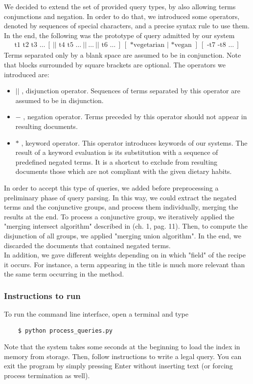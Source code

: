 We decided to extend the set of provided query types, by also allowing terms conjunctions and negation. In order to do that, we introduced some operators, denoted by sequences of special characters, and a precise syntax rule to use them. In the end, the following was the prototype of query admitted by our system
\begin{align*}
	\text{t1 t2 t3 }\ldots \ [ \ || \text{ t4 t5 } \ldots \ || \ \ldots \ || \text{ t6 }\ldots \ ] \ [ \text{ *vegetarian } | \text{ *vegan }] \ [ \text{ -t7 -t8 }\ldots \ ]
\end{align*}
Terms separated only by a blank space are assumed to be in conjunction. Note that blocks surrounded by square brackets are optional. The operators we introduced are:
\begin{itemize}
	\item $||$ , disjunction operator. Sequences of terms separated by this operator are assumed to be in disjunction.
	
	\item $-$ , negation operator. Terms preceded by this operator should not appear in resulting documents.
	
	\item $*$ , keyword operator. This operator introduces keywords of our systems. The result of a keyword evaluation is its substitution with a sequence of predefined negated terms. It is a shortcut to exclude from resulting documents those which are not compliant with the given dietary habits.
\end{itemize}
In order to accept this type of queries, we added before preprocessing a preliminary phase of query parsing. In this way, we could extract the negated terms and the conjunctive groups, and process them individually, merging the results at the end. To process a conjunctive group, we iteratively applied the "merging intersect algorithm" described in \cite{iir} (ch. 1, pag. 11). Then, to compute the disjunction of all groups, we applied "merging union algorithm". In the end, we discarded the documents that contained negated terms.\\
In addition, we gave different weights depending on in which "field" of the recipe it occurs. For instance, a term appearing in the title is much more relevant than the same term occurring in the method.


\subsubsection{Instructions to run}

To run the command line interface, open a terminal and type
\begin{lstlisting}
	$ python process_queries.py
\end{lstlisting}
Note that the system takes some seconds at the beginning to load the index in memory from storage. Then, follow instructions to write a legal query. You can exit the program by simply pressing Enter without inserting text (or forcing process termination as well).
